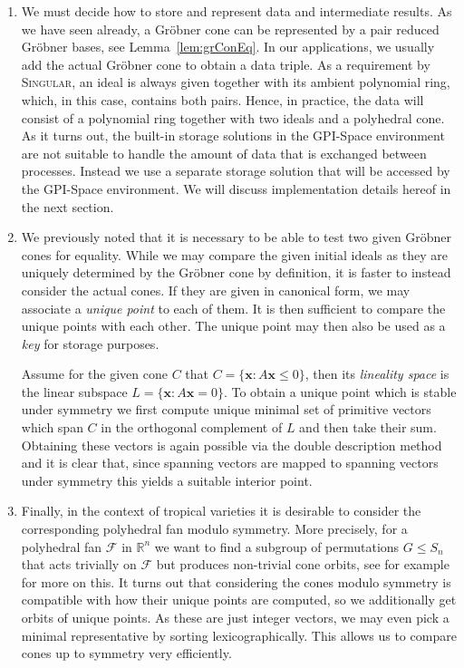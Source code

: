 \documentclass[
  paper=a4,
  titlepage,
  bibliography=totoc,
  pagesize=pdftex
]{scrartcl}
\numberwithin{figure}{section}
\numberwithin{equation}{section}
\numberwithin{table}{section}
\newcommand*\setR{\mathds{R}}
\let\vec\mathbf
\theoremstyle{definition}
\numberwithin{definition}{section}
\begin{document}
\begin{enumerate}[label=\arabic*.]
  \item We must decide how to store and represent data and intermediate results. As we
    have seen already, a Gröbner cone can be represented by a pair reduced Gröbner bases,
    see Lemma~\ref{lem:grConEq}. In our applications, we usually add the actual Gröbner
    cone to obtain a data triple. As a requirement by \textsc{Singular}, an ideal is
    always given together with its ambient polynomial ring, which, in this case, contains
    both pairs. Hence, in practice, the data will consist of a polynomial ring together
    with two ideals and a polyhedral cone. As it turns out, the built-in storage solutions
    in the GPI-Space environment are not suitable to handle the amount of data that is
    exchanged between processes. Instead we use a separate storage solution that will be
    accessed by the GPI-Space environment. We will discuss implementation details hereof
    in the next section.
  \item We previously noted that it is necessary to be able to test two given Gröbner
    cones for equality. While we may compare the given initial ideals as they are uniquely
    determined by the Gröbner cone by definition, it is faster to instead consider the
    actual cones. If they are given in canonical form, we may associate a \emph{unique
    point} to each of them. It is then sufficient to compare the unique points with each
    other. The unique point may then also be used as a \emph{key} for storage purposes.

    Assume for the given cone $C$ that $C = \{ \vec x : A\vec x \leq 0 \}$, then its
    \emph{lineality space} is the linear subspace $L = \{ \vec x : A\vec x=0 \}$. To
    obtain a unique point which is stable under symmetry we first compute unique minimal
    set of primitive vectors which span $C$ in the orthogonal complement of $L$ and then
    take their sum. Obtaining these vectors is again possible via the double description
    method \cite{fuDD} and it is clear that, since spanning vectors are mapped to
    spanning vectors under symmetry this yields a suitable interior point.
  \item Finally, in the context of tropical varieties it is desirable to consider the
    corresponding polyhedral fan modulo symmetry. More precisely, for a polyhedral fan
    $\mathcal F$ in $\setR^n$ we want to find a subgroup of permutations $G \leq S_n$ that
    acts trivially on $\mathcal F$ but produces non-trivial cone orbits, see for example
    \cite{JenTravSym} for more on this. It turns out that considering the cones modulo
    symmetry is compatible with how their unique points are computed, so we additionally
    get orbits of unique points. As these are just integer vectors, we may even pick a
    minimal representative by sorting lexicographically. This allows us to compare cones
    up to symmetry very efficiently.
\end{enumerate}
\end{document}
